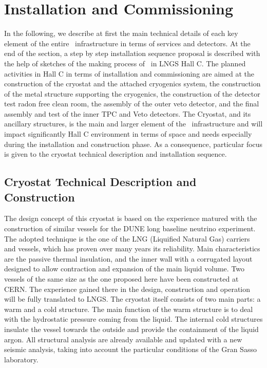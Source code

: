 \section{Installation and Commissioning}
\label{sec:InstallationAndCommissioning}


In the following, we describe at first the main technical details of each key element of the entire \DSks\ infrastructure in terms of services and detectors. At the end of the
section, a step by step installation sequence proposal is described with the help of sketches of the making process of \DSks\ in LNGS Hall C.
The planned activities in Hall C in terms of installation and commissioning are aimed at the construction of the cryostat and the attached cryogenics system, the construction of the metal structure supporting the cryogenics, the construction of the detector test radon free clean room, the assembly of the outer veto detector, and the final assembly and test of the inner TPC and Veto detectors.
The Cryostat, and its ancillary structures, is the main and larger element of the \DSks\
infrastructure and will impact significantly Hall C environment in terms of space and needs especially during the installation and construction phase. As a consequence, particular focus is given to the cryostat technical description and installation sequence.

\subsection{Cryostat Technical Description and Construction}
\label{sec:CryostatConstruction}

The design concept of this cryostat is based on the experience matured with the construction of similar vessels for the DUNE long baseline neutrino experiment. The adopted technique is the one of the LNG (Liquified Natural Gas) carriers and vessels, which has proven over many years its reliability. Main characteristics are the passive thermal insulation, and the inner wall with a corrugated layout designed to allow contraction and expansion of the main liquid volume.
Two vessels of the same size as the one proposed here have been constructed at CERN. The
experience gained there in the design, construction and operation will be fully translated to LNGS.
The cryostat itself consists of two main parts: a warm and a cold structure. The main function of the warm structure is to deal with the hydrostatic pressure coming from the liquid. The internal cold structures insulate the vessel towards the outside and provide the containment of the liquid argon. All structural analysis are already available and updated with a new seismic analysis, taking into account the particular conditions of the Gran Sasso laboratory.

